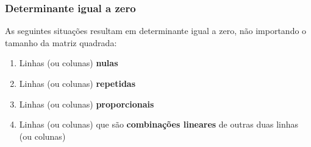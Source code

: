 \documentclass[pdftex, brazil, aspectratio=169]{beamer}
\begin{document}
\begin{frame}[t]
  \frametitle{Determinante igual a zero}
  As seguintes situações resultam em determinante igual a zero, não importando
  o tamanho da matriz quadrada:
    \begin{enumerate}
      \item Linhas (ou colunas) \textbf{nulas}
      \item Linhas (ou colunas) \textbf{repetidas}
      \item Linhas (ou colunas) \textbf{proporcionais}
      \item Linhas (ou colunas) que são \textbf{combinações lineares} de outras
        duas linhas (ou colunas)
    \end{enumerate}
\end{frame}
\end{document}
